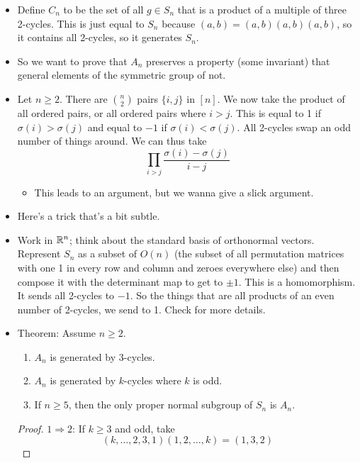 \documentclass[../notes.tex]{subfiles}
\begin{document}
\begin{itemize}
\begin{proof}
    \end{proof}
    \item Define $C_n$ to be the set of all $g\in S_n$ that is a product of a multiple of three 2-cycles. This is just equal to $S_n$ because $(a,b)=(a,b)(a,b)(a,b)$, so it contains all 2-cycles, so it generates $S_n$.
    \item So we want to prove that $A_n$ preserves a property (some invariant) that general elements of the symmetric group of not.
    \item Let $n\geq 2$. There are $\binom{n}{2}$ pairs $\{i,j\}$ in $[n]$. We now take the product of all ordered pairs, or all ordered pairs where $i>j$. This is equal to 1 if $\sigma(i)>\sigma(j)$ and equal to $-1$ if $\sigma(i)<\sigma(j)$. All 2-cycles swap an odd number of things around. We can thus take
    \begin{equation*}
        \prod_{i>j}\frac{\sigma(i)-\sigma(j)}{i-j}
    \end{equation*}
    \begin{itemize}
        \item This leads to an argument, but we wanna give a slick argument.
    \end{itemize}
    \item Here's a trick that's a bit subtle.
    \item Work in $\mathbb{R}^n$; think about the standard basis of orthonormal vectors. Represent $S_n$ as a subset of $O(n)$ (the subset of all permutation matrices with one 1 in every row and column and zeroes everywhere else) and then compose it with the determinant map to get to $\pm 1$. This is a homomorphism. It sends all 2-cycles to $-1$. So the things that are all products of an even number of 2-cycles, we send to 1. Check \textcite{bib:DummitFoote} for more details.
    \item Theorem: Assume $n\geq 2$.
    \begin{enumerate}
        \item $A_n$ is generated by 3-cycles.
        \item $A_n$ is generated by $k$-cycles where $k$ is odd.
        \item If $n\geq 5$, then the only proper normal subgroup of $S_n$ is $A_n$.
    \end{enumerate}
    \begin{proof}
        $1\Rightarrow 2$: If $k\geq 3$ and odd, take
        \begin{equation*}
            (k,\dots,2,3,1)(1,2,\dots,k) = (1,3,2)
        \end{equation*}

\end{proof}
\end{itemize}
\end{document}
